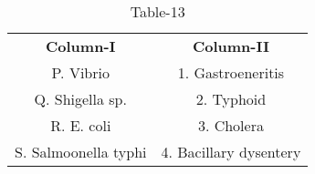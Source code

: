 \begin{table}[htbp]
  \centering
  \caption{Table-13}
  \label{table13}
  \begin{tabular}{cc}
\textbf{Column-I} & \textbf{Column-II}\\

P. Vibrio & 1. Gastroeneritis \\
Q. Shigella sp. & 2. Typhoid \\
R. E. coli & 3. Cholera \\
S. Salmoonella typhi & 4. Bacillary dysentery \\
  
  
  
  \end{tabular}
\end{table}